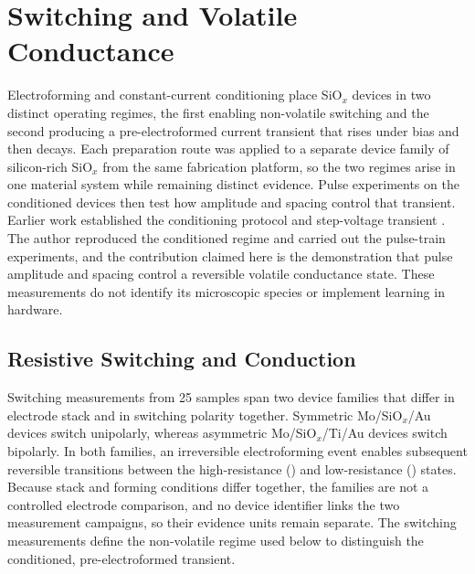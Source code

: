 \chapter{Switching and Volatile Conductance}\label{ch:transients}

\noindent Electroforming and constant-current conditioning place SiO$_x$ devices in two distinct operating regimes,
the first enabling non-volatile switching and the second producing a pre-electroformed current transient that rises
under bias and then decays. Each preparation route was applied to a separate device family of silicon-rich SiO$_x$
from the same fabrication platform, so the two regimes arise in one material system while remaining distinct
evidence. Pulse experiments on the conditioned devices then test how amplitude and spacing control that
transient.\\

\noindent Earlier work established the conditioning protocol and step-voltage transient
\cite{mannion2022current, mannion2023unipolar}. The author reproduced the conditioned regime and carried out the
pulse-train experiments, and the contribution claimed here is the demonstration that pulse amplitude and spacing
control a reversible volatile conductance state. These measurements do not identify its microscopic species or
implement learning in hardware.

\section[Resistive Switching and Conduction]{Resistive Switching and Conduction}\label{sec:4p-switch}

\noindent Switching measurements from 25 samples span two device families that differ in electrode stack and in
switching polarity together. Symmetric Mo\allowbreak/SiO$_x$\allowbreak/Au
devices switch unipolarly, whereas asymmetric Mo\allowbreak/SiO$_x$\allowbreak/Ti\allowbreak/Au devices switch
bipolarly. In both families, an irreversible electroforming event enables subsequent reversible transitions between
the high-resistance () and
low-resistance () states. Because stack and forming conditions differ together, the families are not a
controlled electrode comparison, and no device identifier links the two measurement campaigns, so their evidence units
remain separate. The switching measurements define the non-volatile regime used below to distinguish the conditioned,
pre-electroformed transient.

